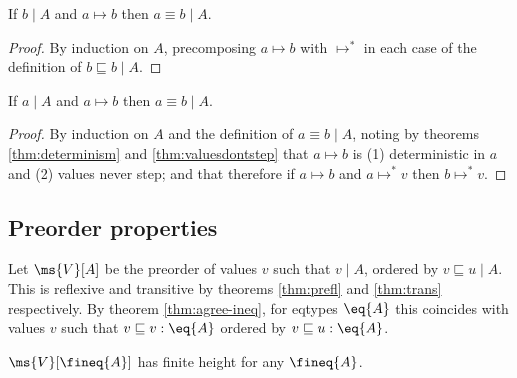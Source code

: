 \documentclass{article}
\newcommand{\ale}{\sqsubseteq}
\newcommand{\aeq}{\equiv}
\newcommand{\step}{\mapsto}
\newcommand{\steps}{\step^*}
\newcommand{\lr}[2]{#2\mathrel{|}#1}
\begin{document}
\begin{lemma}
  If $\lr{A}{b}$ and $a \step b$ then $\lr{A}{a \aeq b}$.
\end{lemma}

\begin{proof}
  By induction on $A$, precomposing $a \step b$ with $\steps$ in each case of
  the definition of $\lr{A}{b \ale b}$.
\end{proof}

\begin{lemma}
  If $\lr{A}{a}$ and $a \step b$ then $\lr{A}{a \aeq b}$.
\end{lemma}

\begin{proof}
  By induction on $A$ and the definition of $\lr{A}{a \aeq b}$, noting by
  theorems \ref{thm:determinism} and \ref{thm:valuesdontstep} that $a \step b$
  is (1) deterministic in $a$ and (2) values never step; and that therefore if
  $a \step b$ and $a \steps v$ then $b \steps v$.
\end{proof}


\subsection{Preorder properties}


\newcommand{\Val}[1]{\ms{V}[#1]}

\begin{definition}
  Let $\Val{A}$ be the preorder of values $v$ such that $\lr{A}{v}$, ordered by
  $\lr{A}{v \ale u}$. This is reflexive and transitive by theorems
  \ref{thm:prefl} and \ref{thm:trans} respectively. By theorem
  \ref{thm:agree-ineq}, for eqtypes $\eq{A}$ this coincides with values $v$ such
  that $v \ale v : \eq{A}$ ordered by $v \ale u : \eq{A}$.
\end{definition}

\begin{theorem}\label{thm:finite-height}
  $\Val{\fineq{A}}$ has finite height for any $\fineq{A}$.
\end{theorem}
\end{document}
